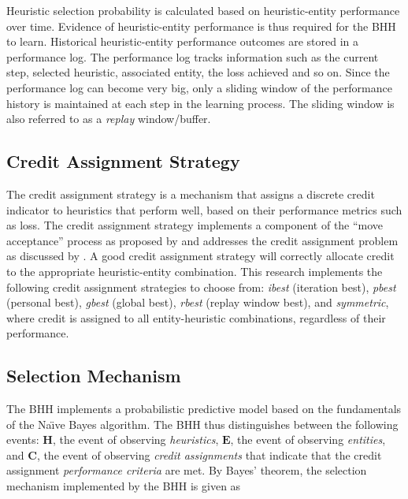 \documentclass[preprint,review,12pt]{elsarticle}
\begin{document}
Heuristic selection probability is calculated based on heuristic-entity performance over time. Evidence of heuristic-entity performance is thus required for the \acs{BHH} to learn. Historical heuristic-entity performance outcomes are stored in a performance log. The performance log tracks information such as the current step, selected heuristic, associated entity, the loss achieved and so on. Since the performance log can become very big, only a sliding window of the performance history is maintained at each step in the learning process. The sliding window is also referred to as a \textit{replay} window/buffer.

\subsection{Credit Assignment Strategy}
\label{sec:bhh:credit_assignment_strategy}

The credit assignment strategy is a mechanism that assigns a discrete credit indicator to heuristics that perform well, based on their performance metrics such as loss. The credit assignment strategy implements a component of the ``move acceptance'' process as proposed by \citet{ref:ozcan:2006} and addresses the credit assignment problem as discussed by \citet{ref:burke:2010}. A good credit assignment strategy will correctly allocate credit to the appropriate heuristic-entity combination. This research implements the following credit assignment strategies to choose from: \textit{ibest} (iteration best), \textit{pbest} (personal best), \textit{gbest} (global best), \textit{rbest} (replay window best), and \textit{symmetric}, where credit is assigned to all entity-heuristic combinations, regardless of their performance.

\subsection{Selection Mechanism}\label{sec:bhh:selection_mechanism}

The \acs{BHH} implements a probabilistic predictive model based on the fundamentals of the Na\"{\i}ve Bayes algorithm. The \acs{BHH} thus distinguishes between the following events: \textbf{$\boldsymbol{H}$}, the event of observing \textit{heuristics}, \textbf{$\boldsymbol{E}$}, the event of observing \textit{entities}, and \textbf{$\boldsymbol{C}$}, the event of observing \textit{credit assignments} that indicate that the credit assignment \textit{performance criteria} are met. By Bayes' theorem, the selection mechanism implemented by the \acs{BHH} is given as
\end{document}
